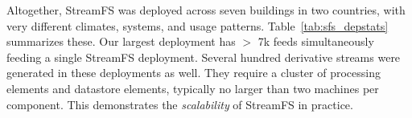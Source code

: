 Altogether, StreamFS was deployed across seven buildings in two countries, with very different climates, systems, and 
usage patterns.  Table~\ref{tab:sfs_depstats} summarizes these.
Our largest deployment has $>$ 7k feeds simultaneously feeding a single StreamFS deployment.  Several hundred derivative streams were generated
in these deployments as well.  They require a cluster of processing elements and datastore elements, typically no larger
than two machines per component.  This demonstrates the \emph{scalability} of StreamFS in practice.

